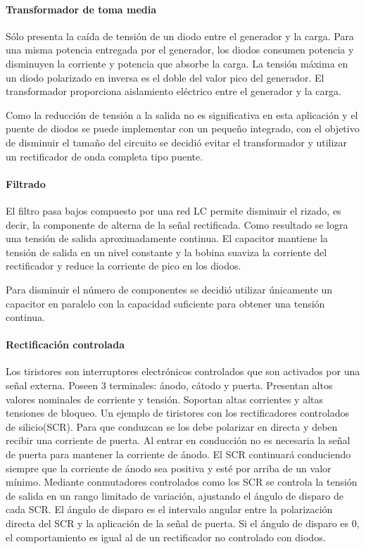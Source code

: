 \paragraph{Transformador de toma media}

Sólo presenta la caída de tensión de un diodo entre el generador y la carga. 
Para una misma potencia entregada por el generador,
los diodos consumen potencia y disminuyen la corriente y potencia que absorbe la carga. 
La tensión máxima en un diodo polarizado en inversa es el doble del valor pico del generador.
El transformador proporciona aislamiento eléctrico entre el generador y la carga. 

Como la reducción de tensión a la salida no es significativa en esta aplicación
y el puente de diodos se puede implementar con un pequeño integrado,
con el objetivo de disminuir el tamaño del circuito se decidió evitar el transformador
y utilizar un rectificador de onda completa tipo puente.

\paragraph{Filtrado}
El filtro pasa bajos compuesto por una red LC permite disminuir el rizado,
es decir, la componente de alterna de la señal rectificada. 
Como resultado se logra una tensión de salida aproximadamente continua.
El capacitor mantiene la tensión de salida en un nivel constante y
la bobina suaviza la corriente del rectificador y reduce la corriente de pico en los diodos. 

Para disminuir el número de componentes se decidió utilizar únicamente
un capacitor en paralelo con la capacidad suficiente para obtener una tensión continua.

\paragraph{Rectificación controlada}

Los tiristores son interruptores electrónicos controlados que son activados por una señal externa. 
Poseen 3 terminales: ánodo, cátodo y puerta. Presentan altos valores nominales de corriente y tensión.
Soportan altas corrientes y altas tensiones de bloqueo. 
Un ejemplo de tiristores con los rectificadores controlados de silicio(SCR).
Para que conduzcan se los debe polarizar en directa y deben recibir una corriente de puerta. 
Al entrar en conducción no es necesaria la señal de puerta para mantener la corriente de ánodo. 
El SCR continuará conduciendo siempre que la corriente de ánodo sea positiva y esté por arriba de un valor mínimo. 
Mediante conmutadores controlados como los SCR se controla la tensión de salida en un rango limitado de variación, ajustando el ángulo de disparo de cada SCR. 
El ángulo de disparo es el intervalo angular entre la polarización directa del SCR y la aplicación de la señal de puerta. 
Si el ángulo de disparo es 0, el comportamiento es igual al de un rectificador no controlado con diodos. 

